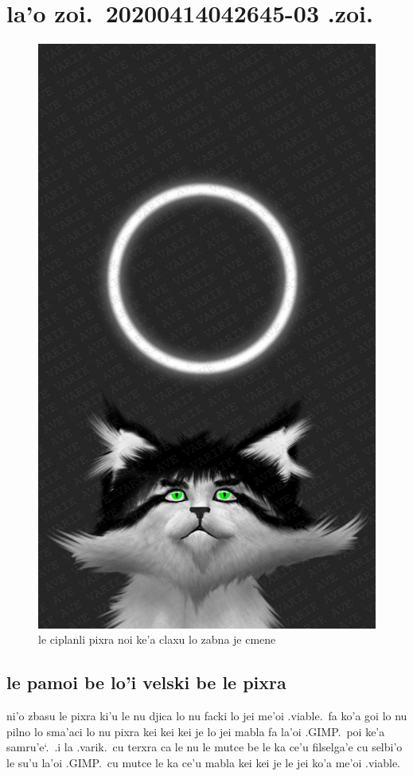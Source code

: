 \documentclass{report}
\newcommand\sds{\spacefactor\sfcode`.\ \space}
\begin{document}
\chapter{la'o zoi.\ 20200414042645-03 .zoi.}
\begin{figure}[ht]
	\centering
	\includegraphics[keepaspectratio, width=\textwidth, height=0.75\textheight]{20200414042645-03/20200414042645-03.jpg}
	\caption[center]{le ciplanli pixra noi ke'a claxu lo zabna je cmene}
\end{figure}
\section{le pamoi be lo'i velski be le pixra}
ni'o zbasu le pixra ki'u le nu djica lo nu facki lo jei me'oi .viable.\ fa ko'a goi lo nu pilno lo sma'aci lo nu pixra kei kei kei je lo jei mabla fa la'oi .GIMP.\ poi ke'a samru'e\sds  .i la .varik.\ cu terxra ca le nu le mutce be le ka ce'u filselga'e cu selbi'o le su'u la'oi .GIMP.\ cu mutce le ka ce'u mabla kei kei je le jei ko'a me'oi .viable.
\end{document}
